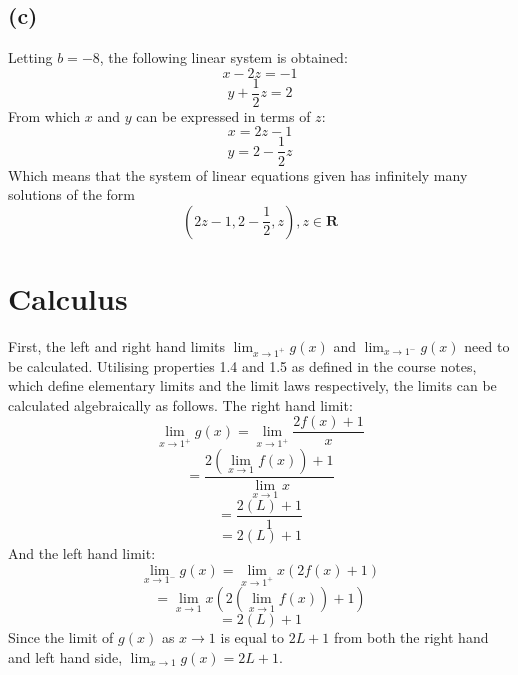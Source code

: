 \documentclass[11pt]{article}
\begin{document}
\subsection*{(c)}
Letting $b=-8$, the following linear system is obtained:
$$x-2z=-1$$
$$y+\frac{1}{2}z=2$$
From which $x$ and $y$ can be expressed in terms of $z$:
$$x=2z-1$$
$$y=2-\frac{1}{2}z$$
Which means that the system of linear equations given has infinitely many solutions of the form
$$(2z-1,2-\frac{1}{2}, z),z \in \mathbf{R}$$
\section*{Calculus}
First, the left and right hand limits $\lim_{x\to 1^+}g(x)$ and $\lim_{x\to 1^-}g(x)$ need to be calculated. Utilising properties 1.4 and 1.5 as defined in the course notes, which define elementary limits and the limit laws respectively, the limits can be calculated algebraically as follows. The right hand limit:
$$\lim_{x\to 1^+}g(x)=\lim_{x\to 1^+}\frac{2f(x)+1}{x} $$ 
$$ =\frac{2(\lim_{x\to 1}f(x))+1}{\lim_{x\to 1}x} $$ 
$$ =\frac{2(L)+1}{1}$$
$$ = 2(L)+1$$
And the left hand limit:
$$\lim_{x\to 1^-}g(x)=\lim_{x\to 1^+}x(2f(x)+1)$$ 
$$ =\lim_{x\to 1}x(2(\lim_{x\to 1}f(x))+1)$$ 
$$ =2(L)+1$$
Since the limit of $g(x)$ as $x\to 1$ is equal to $2L+1$ from both the right hand and left hand side, $\lim_{x\to 1}g(x)=2L+1$.
\end{document}
